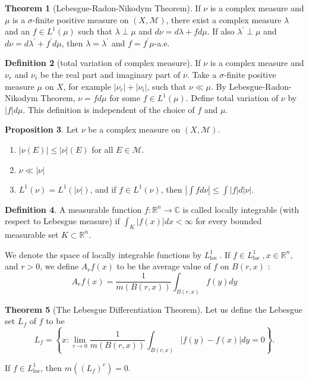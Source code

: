 \documentclass[12pt,a4paper]{book}
\newenvironment{enu}{\begin{enumerate}[(1)]}{\end{enumerate}}
\theoremstyle{definition}
\newtheorem{defn}{Definition}[section]
\newtheorem{theo}[defn]{Theorem}
\newtheorem{prop}[defn]{Proposition}
\begin{document}
\begin{theo}[Lebesgue-Radon-Nikodym Theorem]
    If $\nu$ is a complex measure and $\mu$ is
    a $\sigma$-finite positive measure on
    $(X, \mathcal{M})$, there exist a complex measure $\lambda$
    and an $f \in L^1(\mu)$ such that $\lambda \perp \mu$ and
    $d \nu=d \lambda+f d \mu$. If also $\lambda^{\prime} \perp \mu$ and $d \nu=d \lambda^{\prime}+f^{\prime} d \mu$, then $\lambda=\lambda^{\prime}$ and $f=f^{\prime} \mu$-a.e.
\end{theo}
\begin{defn}[total variation of complex measure]
    If $\nu$ is a complex measure and $\nu_r$ and $\nu_i$
    be the real part and imaginary part of $\nu$. Take a $\sigma$-finite
    positive measure $\mu$ on $X$, for example $|\nu_r|+|\nu_i|$, such that $\nu \ll \mu$. By Lebesgue-Radon-Nikodym Theorem,
    $\nu=fd \mu$ for some $f\in L^1(\mu)$. Define total variation of $\nu$ by $|f|d\mu$.
    This definition is independent of the choice of
    $f$ and $\mu$.
\end{defn}
\begin{prop}
    Let $\nu$ be a complex measure on $(X, \mathcal{M})$.
    \begin{enu}
        \item  $|\nu(E)| \leq|\nu|(E)$ for all $E \in \mathcal{M}$.
        \item  $\nu \ll|\nu|$
        \item  $L^1(\nu)=L^1(|\nu|)$, and if $f \in L^1(\nu)$, then $\left|\int f d \nu\right| \leq \int|f| d|\nu|$.
    \end{enu}
\end{prop}
\begin{defn}
    A measurable function $f: \mathbb{R}^n \rightarrow \mathbb{C}$ is called locally integrable (with respect to Lebesgue measure) if $\int_K|f(x)| d x<\infty$ for every bounded measurable set $K \subset \mathbb{R}^n$.

    We denote the space of locally integrable functions by $L_{\text {loc }}^1$. If $f \in L_{\text {loc }}^1, x \in \mathbb{R}^n$, and $r>0$, we define $A_r f(x)$ to be the average value of $f$ on $B(r, x)$ :
    $$
        A_r f(x)=\frac{1}{m(B(r, x))} \int_{B(r, x)} f(y) d y
    $$
\end{defn}
\begin{theo}[The Lebesgue Differentiation Theorem]
    Let us define the Lebesgue set $L_f$ of $f$ to be
    $$
        L_f=\left\{x: \lim _{r \rightarrow 0} \frac{1}{m(B(r, x))} \int_{B(r, x)}|f(y)-f(x)| d y=0\right\} .
    $$

    If $f \in L_{\mathrm{loc}}^1$, then $m\left(\left(L_f\right)^c\right)=0$.
\end{theo}
\end{document}
